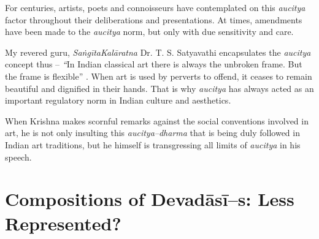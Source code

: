 For centuries, artists, poets and connoisseurs have contemplated on this \textit{aucitya} factor throughout their deliberations and presentations. At times, amendments have been made to the \textit{aucitya} norm, but only with due sensitivity and care.

My revered guru, \textit{Saṅgīta}\textit{Kalāratna} Dr. T. S. Satyavathi encapsulates the \textit{aucitya} concept thus – \textit{“}In Indian classical art there is always the unbroken frame. But the frame is flexible” . When art is used by perverts to offend, it ceases to remain beautiful and dignified in their hands. That is why \textit{aucitya} has always acted as an important regulatory norm in Indian culture and aesthetics.

When Krishna makes scornful remarks against the social conventions involved in art, he is not only insulting this \textit{aucitya–dharma} that is being duly followed in Indian art traditions, but he himself is transgressing all limits of \textit{aucitya} in his speech.

\vspace{-.3cm}

\section*{Compositions of Devadāsī–s: Less Represented?}

